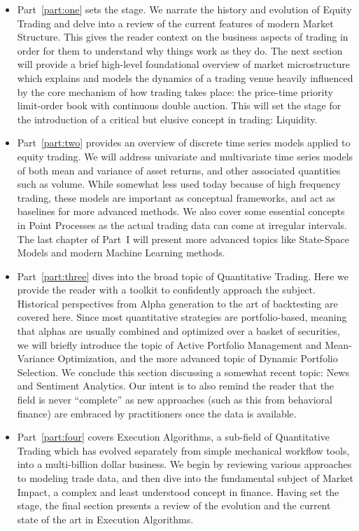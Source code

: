\begin{itemize}
\item Part~\ref{part:one} sets the stage. We narrate the history and evolution of Equity Trading and delve into a review of the current features of modern Market Structure. This gives the reader context on the business aspects of trading in order for them to understand why things work as they do. The next section will provide a brief high-level foundational overview of market microstructure which explains and models the dynamics of a trading venue heavily influenced by the core mechanism of how trading takes place: the price-time priority limit-order book with continuous double auction. This will set the stage for the introduction of a critical but elusive concept in trading: Liquidity.

\item Part~\ref{part:two} provides an overview of discrete time series models applied to equity trading. We will address univariate and multivariate time series models of both mean and variance of asset returns, and other associated quantities such as volume. While somewhat less used today because of high frequency trading, these models are important  as conceptual frameworks, and act as baselines for more advanced methods. We also cover some essential concepts in Point Processes as the actual trading data can come at irregular intervals. The last chapter of Part~I will present more advanced topics like State-Space Models and modern Machine Learning methods.

\item Part~\ref{part:three} dives into the broad topic of Quantitative Trading. Here we provide the reader with a toolkit to confidently approach the subject. Historical perspectives from Alpha generation to the art of backtesting are covered here. Since most quantitative strategies are portfolio-based, meaning that alphas are usually combined  and optimized over a basket of securities, we will briefly introduce the topic of Active Portfolio Management and Mean-Variance Optimization, and the more advanced topic of Dynamic Portfolio Selection. We conclude this section discussing a somewhat recent topic:  News and Sentiment Analytics. Our intent is to also remind the reader that the field is never ``complete'' as new approaches (such as this from behavioral finance) are embraced by practitioners once the data is available.

\item Part~\ref{part:four} covers Execution Algorithms, a sub-field of Quantitative Trading which has evolved separately from simple mechanical workflow tools, into a multi-billion dollar business. We begin by reviewing various approaches to modeling trade data, and then dive into the fundamental subject of Market Impact, a complex and least understood concept in finance. Having set the stage, the final section presents a review of the evolution and the current state of the art in Execution Algorithms.


\end{itemize}
